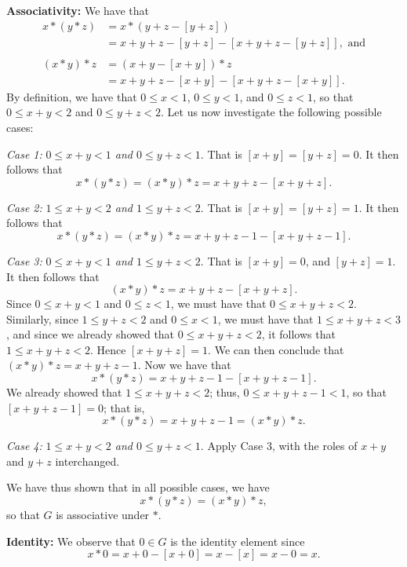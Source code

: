 \begin{enumerate}
      \textbf{Associativity:} We have that
      \begin{align*}
         x * (y * z) &= x * (y + z - [y + z]) \\
              &= x + y + z - [y + z] - [x + y + z - [y + z]], \text{ and} \\ \\
         (x * y) * z &= (x + y - [x + y]) * z \\
                     &=  x + y + z - [x + y] - [x + y + z - [x + y]].
      \end{align*}
      By definition, we have that $0 \le x < 1$, $0 \le y < 1$, and
      $0 \le z < 1$, so that $0 \le x + y < 2$ and $0 \le y + z < 2$. Let us 
      now investigate the following possible cases:

      \textit{Case 1:} \textit{$0 \le x + y  < 1$ and $0 \le y + z < 1$}. That
      is $[x + y] = [y + z] = 0$. It then follows that
      $$x * (y * z) = (x * y) * z = x + y + z - [x + y + z].$$

      \textit{Case 2:} \textit{$1 \le x + y  < 2$ and $1 \le y + z < 2$}. That
      is $[x + y] = [y + z] = 1$. It then follows that
      $$x * (y * z) = (x * y) * z = x + y + z - 1 - [x + y + z - 1].$$

      \textit{Case 3:} \textit{$0 \le x + y  < 1$ and $1 \le y + z < 2$}. That
      is $[x + y] = 0$, and $[y + z] = 1$. It then follows that
      $$(x * y) * z = x + y + z - [x + y + z].$$
      Since $0 \le x + y < 1$ and $0 \le z < 1$, we must have that
      $0 \le x + y + z < 2$. Similarly, since $1 \le y + z < 2$ and
      $0 \le x < 1$, we must have that $1 \le x + y + z < 3$, and since we 
      already showed that $0 \le x + y + z < 2$, it follows that
      $1 \le x + y + z < 2$. Hence $[x + y + z] = 1$. We can then conclude that 
      $(x * y) * z = x +y + z - 1$. Now we have that
      $$x * (y * z) = x + y + z - 1 - [x + y + z - 1].$$
      We already showed that $1 \le x + y + z < 2$; thus,
      $0 \le x + y + z - 1 < 1$, so that $[x + y + z - 1] = 0$; that is,
      $$x * (y * z) = x + y + z - 1 = (x * y) * z.$$
   
      \textit{Case 4:} \textit{$1 \le x + y  < 2$ and $0 \le y + z < 1$}. Apply
      Case 3, with the roles of $x + y$ and $y + z$ interchanged.

      We have thus shown that in all possible cases, we have
      $$x * (y * z) = (x * y) * z,$$
      so that $G$ is associative under $*$.


      \textbf{Identity:} We observe that $0 \in G$ is the identity element since
      $$x * 0 = x + 0 - [x + 0] = x - [x] = x - 0 = x.$$


\end{enumerate}
